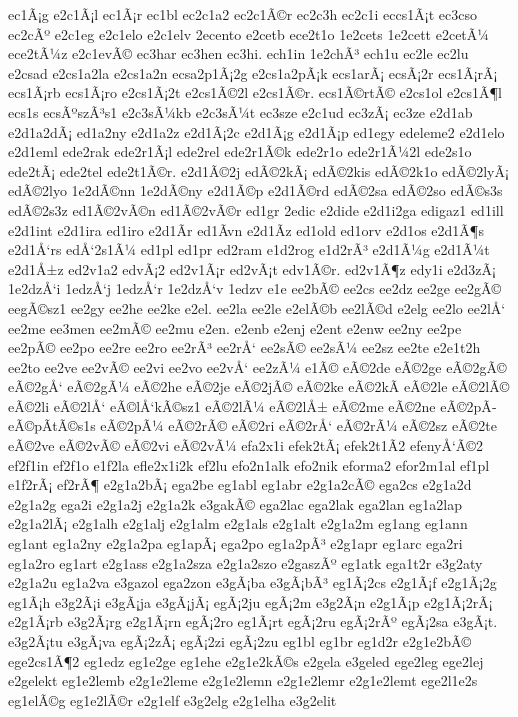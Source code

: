 {ec1Ã¡g
e2c1Ã¡l
ec1Ã¡r
ec1bl
ec2c1a2
ec2c1Ã©r
ec2c3h
ec2c1i
eccs1Ã¡t
ec3cso
ec2cÃº
e2c1eg
e2c1elo
e2c1elv
2ecento
e2cetb
ece2t1o
1e2cets
1e2cett
e2cetÃ¼
ece2tÃ¼z
e2c1evÃ©
ec3har
ec3hen
ec3hi.
ech1in
1e2chÃ³
ech1u
ec2le
ec2lu
e2csad
e2cs1a2la
e2cs1a2n
ecsa2p1Ã¡2g
e2cs1a2pÃ¡k
ecs1arÃ¡
ecsÃ¡2r
ecs1Ã¡rÃ¡
ecs1Ã¡rb
ecs1Ã¡ro
e2cs1Ã¡2t
e2cs1Ã©2l
e2cs1Ã©r.
ecs1Ã©rtÃ©
e2cs1ol
e2cs1Ã¶l
ecs1s
ecsÃºszÃ³s1
e2c3sÃ¼kb
e2c3sÃ¼t
ec3sze
e2c1ud
ec3zÃ¡
ec3ze
e2d1ab
e2d1a2dÃ¡
ed1a2ny
e2d1a2z
e2d1Ã¡2c
e2d1Ã¡g
e2d1Ã¡p
ed1egy
edeleme2
e2d1elo
e2d1eml
ede2rak
ede2r1Ã¡l
ede2rel
ede2r1Ã©k
ede2r1o
ede2r1Ã¼2l
ede2s1o
ede2tÃ¡
ede2tel
ede2t1Ã©r.
e2d1Ã©2j
edÃ©2kÃ¡
edÃ©2kis
edÃ©2k1o
edÃ©2lyÃ¡
edÃ©2lyo
1e2dÃ©nn
1e2dÃ©ny
e2d1Ã©p
e2d1Ã©rd
edÃ©2sa
edÃ©2so
edÃ©s3s
edÃ©2s3z
ed1Ã©2vÃ©n
ed1Ã©2vÃ©r
ed1gr
2edic
e2dide
e2d1i2ga
edigaz1
ed1ill
e2d1int
e2d1ira
ed1iro
e2d1Ã­r
ed1Ã­vn
e2d1Ã­z
ed1old
ed1orv
e2d1os
e2d1Ã¶s
e2d1Å‘rs
edÅ‘2s1Ã¼
ed1pl
ed1pr
ed2ram
e1d2rog
e1d2rÃ³
e2d1Ã¼g
e2d1Ã¼t
e2d1Å±z
ed2v1a2
edvÃ¡2
ed2v1Ã¡r
ed2vÃ¡t
edv1Ã©r.
ed2v1Ã¶z
edy1i
e2d3zÃ¡
1e2dzÅ‘i
1edzÅ‘j
1edzÅ‘r
1e2dzÅ‘v
1edzv
e1e
ee2bÃ©
ee2cs
ee2dz
ee2ge
ee2gÃ©
eegÃ©sz1
ee2gy
ee2he
ee2ke
e2el.
ee2la
ee2le
e2elÃ©b
ee2lÃ©d
e2elg
ee2lo
ee2lÅ‘
ee2me
ee3men
ee2mÃ©
ee2mu
e2en.
e2enb
e2enj
e2ent
e2enw
ee2ny
ee2pe
ee2pÃ©
ee2po
ee2re
ee2ro
ee2rÃ³
ee2rÅ‘
ee2sÃ©
ee2sÃ¼
ee2sz
ee2te
e2e1t2h
ee2to
ee2ve
ee2vÃ©
ee2vi
ee2vo
ee2vÅ‘
ee2zÃ¼
e1Ã©
eÃ©2de
eÃ©2ge
eÃ©2gÃ©
eÃ©2gÅ‘
eÃ©2gÃ¼
eÃ©2he
eÃ©2je
eÃ©2jÃ©
eÃ©2ke
eÃ©2kÃ­
eÃ©2le
eÃ©2lÃ©
eÃ©2li
eÃ©2lÅ‘
eÃ©lÅ‘kÃ©sz1
eÃ©2lÃ¼
eÃ©2lÅ±
eÃ©2me
eÃ©2ne
eÃ©2pÃ­
eÃ©pÃ­tÃ©s1s
eÃ©2pÃ¼
eÃ©2rÃ©
eÃ©2ri
eÃ©2rÅ‘
eÃ©2rÃ¼
eÃ©2sz
eÃ©2te
eÃ©2ve
eÃ©2vÃ©
eÃ©2vi
eÃ©2vÃ¼
efa2x1i
efek2tÃ¡
efek2t1Ã­2
efenyÅ‘Ã©2
ef2f1in
ef2f1o
e1f2la
efle2x1i2k
ef2lu
efo2n1alk
efo2nik
eforma2
efor2m1al
ef1pl
e1f2rÃ¡
ef2rÃ¶
e2g1a2bÃ¡
ega2be
eg1abl
eg1abr
e2g1a2cÃ©
ega2cs
e2g1a2d
e2g1a2g
ega2i
e2g1a2j
e2g1a2k
e3gakÃ©
ega2lac
ega2lak
ega2lan
eg1a2lap
e2g1a2lÃ¡
e2g1alh
e2g1alj
e2g1alm
e2g1als
e2g1alt
e2g1a2m
eg1ang
eg1ann
eg1ant
eg1a2ny
e2g1a2pa
eg1apÃ¡
ega2po
eg1a2pÃ³
e2g1apr
eg1arc
ega2ri
eg1a2ro
eg1art
e2g1ass
e2g1a2sza
e2g1a2szo
e2gaszÃº
eg1atk
ega1t2r
e3g2aty
e2g1a2u
eg1a2va
e3gazol
ega2zon
e3gÃ¡ba
e3gÃ¡bÃ³
eg1Ã¡2cs
e2g1Ã¡f
e2g1Ã¡2g
eg1Ã¡h
e3g2Ã¡i
e3gÃ¡ja
e3gÃ¡jÃ¡
egÃ¡2ju
egÃ¡2m
e3g2Ã¡n
e2g1Ã¡p
e2g1Ã¡2rÃ¡
e2g1Ã¡rb
e3g2Ã¡rg
e2g1Ã¡rn
egÃ¡2ro
eg1Ã¡rt
egÃ¡2ru
egÃ¡2rÃº
egÃ¡2sa
e3gÃ¡t.
e3g2Ã¡tu
e3gÃ¡va
egÃ¡2zÃ¡
egÃ¡2zi
egÃ¡2zu
eg1bl
eg1br
eg1d2r
e2g1e2bÃ©
ege2cs1Ã¶2
eg1edz
eg1e2ge
eg1ehe
e2g1e2kÃ©s
e2gela
e3geled
ege2leg
ege2lej
e2gelekt
eg1e2lemb
e2g1e2leme
e2g1e2lemn
e2g1e2lemr
e2g1e2lemt
ege2l1e2s
eg1elÃ©g
eg1e2lÃ©r
e2g1elf
e3g2elg
e2g1elha
e3g2elit
}

